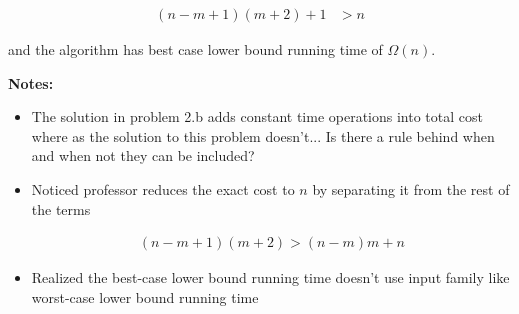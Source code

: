 \documentclass[12pt]{article}
\begin{document}
\begin{enumerate}[a.]
\begin{mdframed}
        \begin{align}
            (n-m+1)(m+2) + 1 &> n
        \end{align}

        and the algorithm has best case lower bound running time of $\Omega(n)$.
        \color{black}
    \end{mdframed}

    \bigskip

    \textbf{Notes:}

    \begin{itemize}
        \item The solution in problem 2.b adds constant time operations
        into total cost where as the solution to this problem doesn't... Is there
        a rule behind when and when not they can be included?

        \item Noticed professor reduces the exact cost to $n$ by separating it
        from the rest of the terms

        \begin{mdframed}
            \begin{align*}
                (n-m+1)(m+2) > (n-m)m + n
            \end{align*}
        \end{mdframed}

        \item Realized the best-case lower bound running time doesn't use input family
        like worst-case lower bound running time
    \end{itemize}

\end{enumerate}
\end{document}
